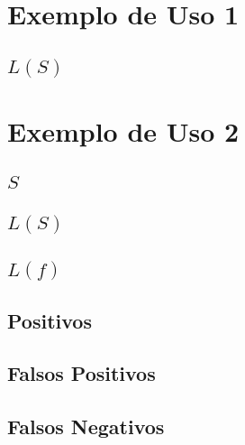 \begin{apendicesenv}

\partapendices

\chapter{Exemplo de Uso 1} \label{apendice:eu1}
\section{$L(S)$} \label{apendice:eu1:LS}


\chapter{Exemplo de Uso 2} \label{apendice:eu2}
\section{$S$} \label{apendice:eu2:S}

\section{$L(S)$} \label{apendice:eu2:LS}

\section{$L(f)$} \label{apendice:eu2:Lf}

\section{Positivos} \label{apendice:eu2:positivo}

\section{Falsos Positivos} \label{apendice:eu2:falso_positivo}

\section{Falsos Negativos} \label{apendice:eu2:falso_negativo}

%


\end{apendicesenv}
